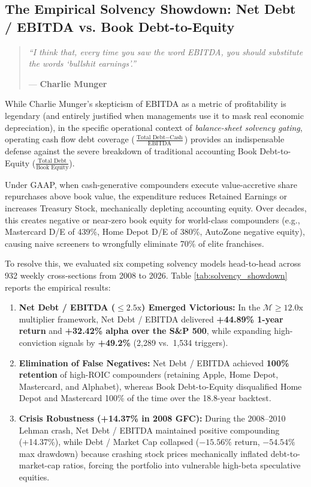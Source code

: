 \documentclass[10pt,twocolumn]{article}
\begin{document}
\subsection{The Empirical Solvency Showdown: Net Debt / EBITDA vs. Book Debt-to-Equity}
\begin{quote}
\small\itshape ``I think that, every time you saw the word EBITDA, you should substitute the words `bullshit earnings'.''
\par\hfill\upshape --- \textbf{Charlie Munger}
\end{quote}
While Charlie Munger's skepticism of EBITDA as a metric of profitability is legendary (and entirely justified when managements use it to mask real economic depreciation), in the specific operational context of \textit{balance-sheet solvency gating}, operating cash flow debt coverage ($\frac{\text{Total Debt} - \text{Cash}}{\text{EBITDA}}$) provides an indispensable defense against the severe breakdown of traditional accounting Book Debt-to-Equity ($\frac{\text{Total Debt}}{\text{Book Equity}}$). 

Under GAAP, when cash-generative compounders execute value-accretive share repurchases above book value, the expenditure reduces Retained Earnings or increases Treasury Stock, mechanically depleting accounting equity. Over decades, this creates negative or near-zero book equity for world-class compounders (e.g., Mastercard D/E of 439\%, Home Depot D/E of 380\%, AutoZone negative equity), causing naive screeners to wrongfully eliminate 70\% of elite franchises.

To resolve this, we evaluated six competing solvency models head-to-head across 932 weekly cross-sections from 2008 to 2026. Table \ref{tab:solvency_showdown} reports the empirical results:
\begin{enumerate}
    \item \textbf{Net Debt / EBITDA ($\le 2.5\text{x}$) Emerged Victorious:} In the $\mathcal{M} \ge 12.0\text{x}$ multiplier framework, Net Debt / EBITDA delivered \textbf{+44.89\% 1-year return} and \textbf{+32.42\% alpha over the S\&P 500}, while expanding high-conviction signals by \textbf{+49.2\%} (2,289 vs.\ 1,534 triggers).
    \item \textbf{Elimination of False Negatives:} Net Debt / EBITDA achieved \textbf{100\% retention} of high-ROIC compounders (retaining Apple, Home Depot, Mastercard, and Alphabet), whereas Book Debt-to-Equity disqualified Home Depot and Mastercard 100\% of the time over the 18.8-year backtest.
    \item \textbf{Crisis Robustness (+14.37\% in 2008 GFC):} During the 2008--2010 Lehman crash, Net Debt / EBITDA maintained positive compounding (+14.37\%), while Debt / Market Cap collapsed ($-15.56\%$ return, $-54.54\%$ max drawdown) because crashing stock prices mechanically inflated debt-to-market-cap ratios, forcing the portfolio into vulnerable high-beta speculative equities.
\end{enumerate}
\end{document}
